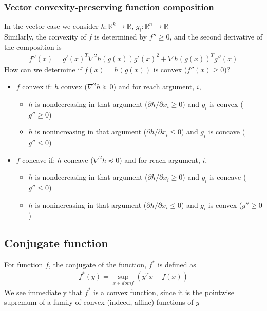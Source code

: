 \documentclass{article}
\begin{document}
\subsubsection{Vector convexity-preserving function composition}\label{vectorComp}
In the vector case we consider $h:\mathbb{R}^k \rightarrow \mathbb{R}$, $g_i:\mathbb{R}^n \rightarrow \mathbb{R}$\\
Similarly, the convexity of $f$ is determined by $f'' \geq 0$, and the second derivative of the composition is
\begin{align*}
  f''(x) = g'(x)^T \nabla^2h(g(x)) g'(x)^2 + \nabla h(g(x))^T g''(x)
\end{align*}
How can we determine if $f(x) = h(g(x))$ is convex ($f''(x) \geq 0$)?
\begin{itemize}
  \item $f$ convex if: $h$ convex ($\nabla^2h \succeq 0$) and for reach argument, $i$, 
  \begin{itemize}
    \item $h$ is nondecreasing in that argument ($\partial h / \partial x_i \geq 0$) and $g_i$ is convex ($g'' \geq 0$)
    \item $h$ is nonincreasing in that argument ($\partial h / \partial x_i \leq 0$) and $g_i$ is concave ($g'' \leq 0$)
  \end{itemize}
  \item $f$ concave if: $h$ concave ($\nabla^2h \preceq 0$) and for reach argument, $i$, 
  \begin{itemize}
    \item $h$ is nondecreasing in that argument ($\partial h / \partial x_i \geq 0$) and $g_i$ is concave ($g'' \leq 0$)
    \item $h$ is nonincreasing in that argument ($\partial h / \partial x_i \leq 0$) and $g_i$ is convex ($g'' \geq 0$)
  \end{itemize}
\end{itemize}

\subsection{Conjugate function}
For function $f$, the conjugate of the function, $f^*$ is defined as
\begin{align*}
  f^*(y) = \sup_{x \in dom f} (y^Tx - f(x))
\end{align*}
We see immediately that $f^*$ is a convex function, since it is the pointwise supremum of a family of convex (indeed, affine) functions of $y$
\end{document}
